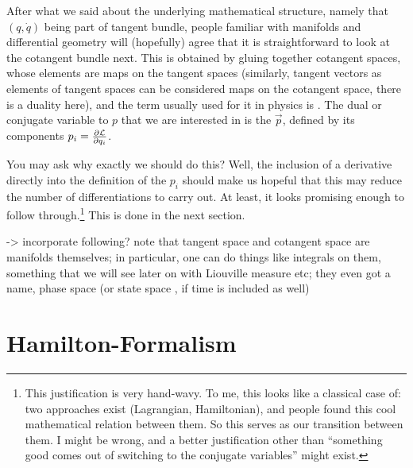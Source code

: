 \documentclass[../class_mech_main.tex]{subfiles}
\begin{document}
After what we said about the underlying mathematical structure, namely that $(q, \dot{q})$ being part of tangent bundle, people familiar with manifolds and differential geometry will (hopefully) agree that it is straightforward to look at the cotangent bundle next. This is obtained by gluing together cotangent spaces, whose elements are maps on the tangent spaces (similarly, tangent vectors as elements of tangent spaces can be considered maps on the cotangent space, there is a duality here), and the term usually used for it in physics is . The dual or conjugate variable to $p$ that we are interested in is the  $\vec{p}$, defined by its components $p_i = \pdv{\mathcal{L}}{q_i}$. 


You may ask why exactly we should do this? Well, the inclusion of a derivative directly into the definition of the $p_i$ should make us hopeful that this may reduce the number of differentiations to carry out. At least, it looks promising enough to follow through.\footnote{This justification is very hand-wavy. To me, this looks like a classical case of: two approaches exist (Lagrangian, Hamiltonian), and people found this cool mathematical relation between them. So this serves as our transition between them. I might be wrong, and a better justification other than \enquote{something good comes out of switching to the conjugate variables} might exist.} This is done in the next section.


-> incorporate following? note that tangent space and cotangent space are manifolds themselves; in particular, one can do things like integrals on them, something that we will see later on with Liouville measure etc; they even got a name, phase space (or state space , if time is included as well)




	\section{Hamilton-Formalism}
\end{document}
